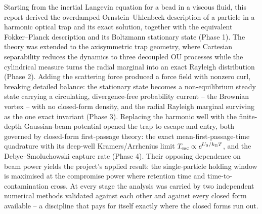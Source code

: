 \documentclass[11pt]{article}
\newcommand{\kB}{k_{\mathrm{B}}}
\begin{document}
Starting from the inertial Langevin equation for a bead in a viscous fluid, this report derived the overdamped Ornstein--Uhlenbeck description of a particle in a harmonic optical trap and its exact solution, together with the equivalent Fokker--Planck description and its Boltzmann stationary state (Phase 1). The theory was extended to the axisymmetric trap geometry, where Cartesian separability reduces the dynamics to three decoupled OU processes while the cylindrical measure turns the radial marginal into an exact Rayleigh distribution (Phase 2). Adding the scattering force produced a force field with nonzero curl, breaking detailed balance: the stationary state becomes a non-equilibrium steady state carrying a circulating, divergence-free probability current -- the Brownian vortex -- with no closed-form density, and the radial Rayleigh marginal surviving as the one exact invariant (Phase 3). Replacing the harmonic well with the finite-depth Gaussian-beam potential opened the trap to escape and entry, both governed by closed-form first-passage theory: the exact mean-first-passage-time quadrature with its deep-well Kramers/Arrhenius limit $T_{\rm esc} \propto e^{U_0/\kB T}$, and the Debye--Smoluchowski capture rate (Phase 4). Their opposing dependence on beam power yields the project's applied result: the single-particle holding window is maximised at the compromise power where retention time and time-to-contamination cross. At every stage the analysis was carried by two independent numerical methods validated against each other and against every closed form available -- a discipline that pays for itself exactly where the closed forms run out.
\end{document}
